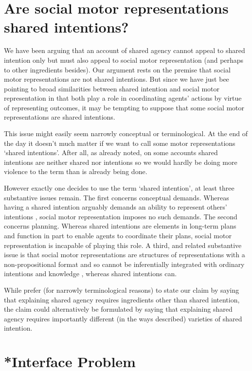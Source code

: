 \documentclass[12pt,\papersize]{extarticle}
\begin{document}
\section{Are social motor representations shared intentions?}

We have been arguing that an account of shared agency cannot appeal to shared intention only  but must also appeal to  social motor representation (and perhaps to other ingredients besides).
Our argument rests on the premise that social motor representations are not shared intentions.
But since we have just bee pointing to broad similarities between shared intention and social motor representation in that both play a role in coordinating agents’ actions by virtue of representing outcomes,
it may be tempting to suppose that some social motor representations are  shared intentions.

This issue might easily seem narrowly conceptual or terminological.  
At the end of the day it doesn’t much matter if we want to call some motor representations ‘shared intentions’.  
After all, as already noted, on some accounts shared intentions are neither shared nor intentions so we would hardly be doing more violence to the term than is already being done.  

However exactly one decides to use the term `shared intention',  at least three substantive issues remain. 
The first concerns conceptual demands.
Whereas having a shared intention arguably demands an ability to represent others' intentions \citep[pp.\ *][]{Butterfill:2011fk},
social motor representation imposes no such demands.
The second concerns planning.
Whereas shared intentions are elements in long-term plans and function in part to enable agents to coordinate their plans, social motor representation is incapable of playing this role.
A third, and related substantive issue is that social motor representations are structures of representations with a non-propositional format and so cannot be inferentially integrated with ordinary intentions and knowledge \citep[pp.\ *][]{butterfill:2012_intention}, whereas shared intentions can.

While prefer (for narrowly terminological reasons) to state our claim by saying that explaining shared agency requires ingredients other than shared intention,
the claim could alternatively be formulated by saying that  explaining shared agency requires importantly different (in the ways described) varieties of shared intention.



\section{*Interface Problem}
\end{document}
